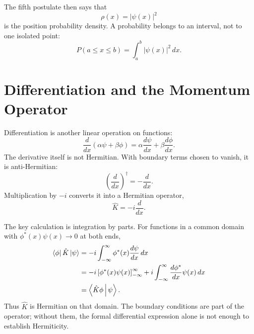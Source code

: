 The fifth postulate then says that
\begin{equation}
  \rho(x)=|\psi(x)|^2
  \label{eq:position-density}
\end{equation}
is the position probability density. A probability belongs to an interval,
not to one isolated point:
\begin{equation}
  P(a\leq x\leq b)
  =
  \int_a^b|\psi(x)|^2\,dx.
\end{equation}

\begin{classroomqa}
\end{classroomqa}

\section{Differentiation and the Momentum Operator}

Differentiation is another linear operation on functions:
\begin{equation}
  \frac{d}{dx}(\alpha\psi+\beta\phi)
  =
  \alpha\frac{d\psi}{dx}
  +
  \beta\frac{d\phi}{dx}.
\end{equation}
The derivative itself is not Hermitian. With boundary terms chosen to vanish,
it is anti-Hermitian:
\begin{equation}
  \left(\frac{d}{dx}\right)^\dagger
  =
  -\frac{d}{dx}.
\end{equation}
Multiplication by \(-i\) converts it into a Hermitian operator,
\begin{equation}
  \hat K=-i\frac{d}{dx}.
  \label{eq:k-operator}
\end{equation}

The key calculation is integration by parts. For functions in a common
domain with \(\phi^*(x)\psi(x)\to0\) at both ends,
\begin{align}
  \left\langle\phi\right\rvert\hat K\left\lvert\psi\right\rangle
  &=
  -i\int_{-\infty}^{\infty}
  \phi^*(x)\frac{d\psi}{dx}\,dx\\
  &=
  -i\left[\phi^*(x)\psi(x)\right]_{-\infty}^{\infty}
  +i\int_{-\infty}^{\infty}
  \frac{d\phi^*}{dx}\psi(x)\,dx\\
  &=
  \left\langle\hat K\phi\,\middle|\,\psi\right\rangle.
  \label{eq:k-hermitian}
\end{align}
Thus \(\hat K\) is Hermitian on that domain. The boundary conditions are part
of the operator; without them, the formal differential expression alone is
not enough to establish Hermiticity.

